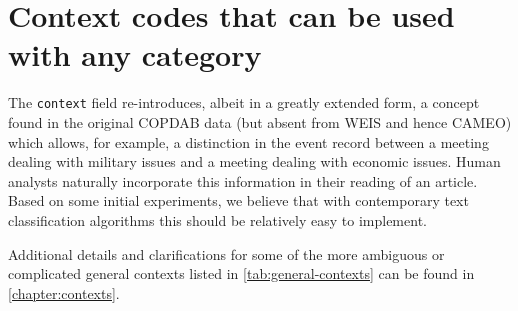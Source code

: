 \documentclass[11pt]{report}
\newcommand{\txt}[1]{\texttt{#1}}
\begin{document}
\section{Context codes that can be used with any category}

The \txt{context} field re-introduces, albeit in a greatly extended form, a concept found in the original COPDAB data (but absent from WEIS and hence CAMEO) which allows, for example, a distinction in the event record between a meeting dealing with military issues and a meeting dealing with economic issues. Human analysts naturally incorporate this information in their reading of an article. Based on some initial experiments, we believe that with contemporary text classification algorithms this should be relatively easy to implement.

Additional details and clarifications for some of the more ambiguous or complicated general contexts listed in \autoref{tab:general-contexts} can be found in \autoref{chapter:contexts}.

\end{document}
